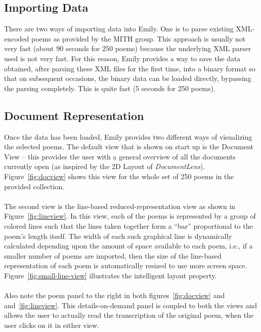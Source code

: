 \documentclass[10pt, twocolumn]{article}
\begin{document}
\subsection{Importing Data}\label{sec:data}
There are two ways of importing data into Emily. One is to parse existing XML-encoded poems as provided by the MITH group. This approach is usually not very fast (about 90 seconds for 250 poems) because the underlying XML parser used is not very fast. For this reason, Emily provides a way to save the data obtained, after parsing these XML files for the first time, into a binary format so that on subsequent occasions, the binary data can be loaded directly, bypassing the parsing completely. This is quite fast (5 seconds for 250 poems). 
\subsection{Document Representation}\label{sec:docview}
Once the data has been loaded, Emily provides two different ways of visualizing the selected poems. The default view that is shown on start up is the Document View -- this provides the user with a general overview of all the documents currently open (as inspired by the 2D Layout of \textit{DocumentLens}). Figure~\ref{fig:docview} shows this view for the whole set of 250 poems in the provided collection. \\ \\
The second view is the line-based reduced-representation view as shown in Figure~\ref{fig:lineview}. In this view, each of the poems is represented by a group of colored lines such that the lines taken together form a ``bar'' proportional to the poem's length itself. The width of each such graphical line is dynamically calculated depending upon the amount of space available to each poem, i.e., if a smaller number of poems are imported, then the size of the line-based representation of each poem is automatically resized to use more screen space. Figure~\ref{fig:small-line-view} illustrates the intelligent layout property. \\ \\
Also note the poem panel to the right in both figures~\ref{fig:docview} and and~\ref{fig:lineview}. This details-on-demand panel is coupled to both the views and allows the user to actually read the transcription of the original poem, when the user clicks on it in either view. 
\end{document}
